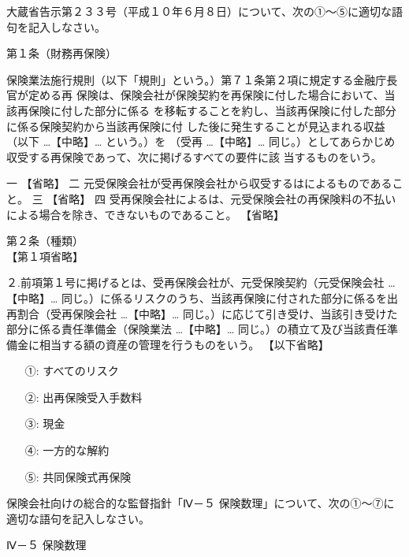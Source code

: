 \documentclass[report,gutter=10mm,fore-edge=10mm,uplatex,dvipdfmx]{jlreq}
\begin{document}
大蔵省告示第２３３号（平成１０年６月８日）について、次の①～⑤に適切な語句を記入しなさい。

第１条（財務再保険）

保険業法施行規則（以下「規則」という。）第７１条第２項に規定する金融庁長官が定める再
保険は、保険会社が保険契約を再保険に付した場合において、当該再保険に付した部分に係る
を移転することを約し、当該再保険に付した部分に係る保険契約から当該再保険に付
した後に発生することが見込まれる収益（以下 …【中略】… という。）を
（受再 …【中略】… 同じ。）としてあらかじめ収受する再保険であって、次に掲げるすべての要件に該
当するものをいう。

一 【省略】
二 元受保険会社が受再保険会社から収受するはによるものであること。
三 【省略】
四 受再保険会社によるは、元受保険会社の再保険料の不払いによる場合を除き、できないものであること。
【省略】

第２条（種類）\\
【第１項省略】

２.前項第１号に掲げるとは、受再保険会社が、元受保険契約（元受保険会社 …【中略】… 同じ。）に係るリスクのうち、当該再保険に付された部分に係るを出再割合（受再保険会社 …【中略】… 同じ。）に応じて引き受け、当該引き受けた部分に係る責任準備金（保険業法 …【中略】… 同じ。）の積立て及び当該責任準備金に相当する額の資産の管理を行うものをいう。
【以下省略】

\answer{}
\begin{itemize}
\item[ ①: ]  すべてのリスク
\item[ ②: ]  出再保険受入手数料
\item[ ③: ]  現金
\item[ ④: ]  一方的な解約
\item[ ⑤: ]  共同保険式再保険
\end{itemize}


保険会社向けの総合的な監督指針「Ⅳ－５ 保険数理」について、次の①～⑦に適切な語句を記入しなさい。

\noindent{} Ⅳ－５ 保険数理
\end{document}
